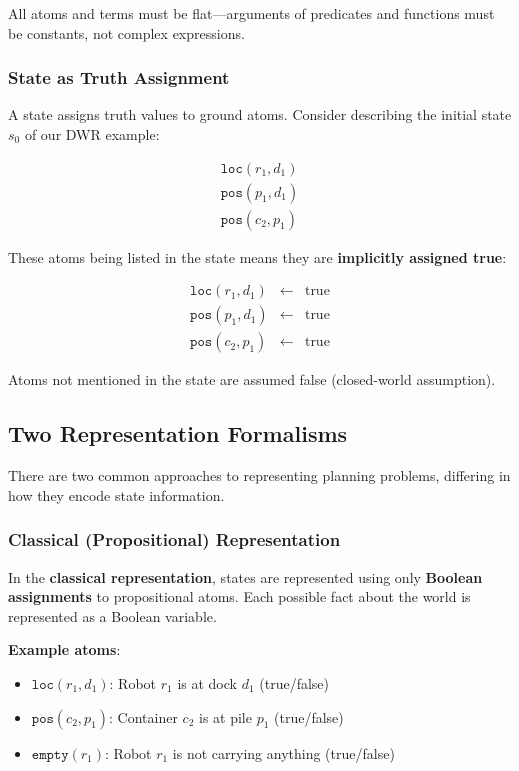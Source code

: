 \documentclass[11pt,a4paper]{article}
\theoremstyle{definition}
\theoremstyle{plain}
\theoremstyle{remark}
\begin{document}
All atoms and terms must be flat—arguments of predicates and functions must be constants, not complex expressions.

\subsubsection{State as Truth Assignment}

A state assigns truth values to ground atoms. Consider describing the initial state $s_0$ of our DWR example:

\[
\begin{array}{l}
\texttt{loc}(r_1, d_1) \\
\texttt{pos}(p_1, d_1) \\
\texttt{pos}(c_2, p_1)
\end{array}
\]

These atoms being listed in the state means they are \textbf{implicitly assigned true}:

\[
\begin{array}{lcl}
\texttt{loc}(r_1, d_1) & \leftarrow & \text{true} \\
\texttt{pos}(p_1, d_1) & \leftarrow & \text{true} \\
\texttt{pos}(c_2, p_1) & \leftarrow & \text{true}
\end{array}
\]

Atoms not mentioned in the state are assumed false (closed-world assumption).

\subsection{Two Representation Formalisms}

There are two common approaches to representing planning problems, differing in how they encode state information.

\subsubsection{Classical (Propositional) Representation}

In the \textbf{classical representation}, states are represented using only \textbf{Boolean assignments} to propositional atoms. Each possible fact about the world is represented as a Boolean variable.

\textbf{Example atoms}:
\begin{itemize}
    \item $\texttt{loc}(r_1, d_1)$: Robot $r_1$ is at dock $d_1$ (true/false)
    \item $\texttt{pos}(c_2, p_1)$: Container $c_2$ is at pile $p_1$ (true/false)
    \item $\texttt{empty}(r_1)$: Robot $r_1$ is not carrying anything (true/false)
\end{itemize}
\end{document}
